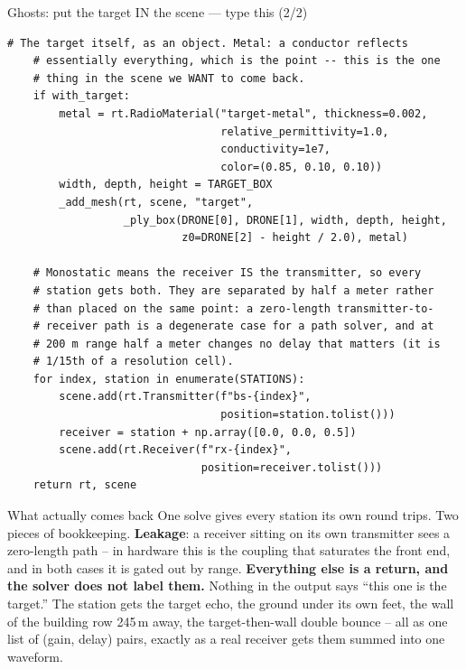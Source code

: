 \documentclass[10pt]{beamer}
\begin{document}
\begin{frame}[fragile]{Ghosts: put the target IN the scene --- type this (2/2)}
\begin{lstlisting}[basicstyle=\ttfamily\tiny]
    # The target itself, as an object. Metal: a conductor reflects
    # essentially everything, which is the point -- this is the one
    # thing in the scene we WANT to come back.
    if with_target:
        metal = rt.RadioMaterial("target-metal", thickness=0.002,
                                 relative_permittivity=1.0,
                                 conductivity=1e7,
                                 color=(0.85, 0.10, 0.10))
        width, depth, height = TARGET_BOX
        _add_mesh(rt, scene, "target",
                  _ply_box(DRONE[0], DRONE[1], width, depth, height,
                           z0=DRONE[2] - height / 2.0), metal)

    # Monostatic means the receiver IS the transmitter, so every
    # station gets both. They are separated by half a meter rather
    # than placed on the same point: a zero-length transmitter-to-
    # receiver path is a degenerate case for a path solver, and at
    # 200 m range half a meter changes no delay that matters (it is
    # 1/15th of a resolution cell).
    for index, station in enumerate(STATIONS):
        scene.add(rt.Transmitter(f"bs-{index}",
                                 position=station.tolist()))
        receiver = station + np.array([0.0, 0.0, 0.5])
        scene.add(rt.Receiver(f"rx-{index}",
                              position=receiver.tolist()))
    return rt, scene
\end{lstlisting}
\end{frame}

\begin{frame}{What actually comes back}
  One solve gives every station its own round trips. Two
  pieces of bookkeeping. \textbf{Leakage}: a receiver
  sitting on its own transmitter sees a zero-length path
  -- in hardware this is the coupling that saturates the
  front end, and in both cases it is gated out by range.
  \textbf{Everything else is a return, and the solver does
  not label them.} Nothing in the output says ``this one
  is the target.'' The station gets the target echo, the
  ground under its own feet, the wall of the building row
  245\,m away, the target-then-wall double bounce -- all
  as one list of (gain, delay) pairs, exactly as a real
  receiver gets them summed into one waveform.
\end{frame}
\end{document}
